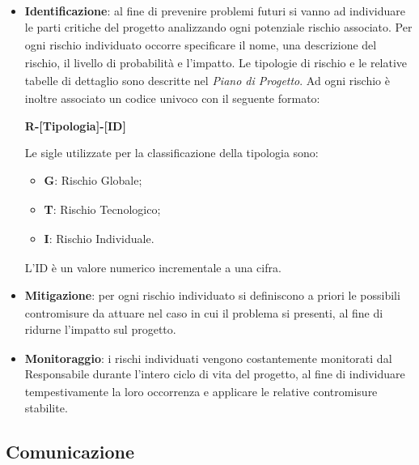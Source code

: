 \documentclass[a4paper,11pt]{article}
\newcommand{\G}{\textsubscript{\scalebox{0.6}{\textbf{G}}}}
\begin{document}
\begin{itemize}
    \item \textbf{Identificazione}: al fine di prevenire problemi futuri si vanno ad individuare le parti critiche del progetto\G{} analizzando ogni potenziale rischio\G{} associato. Per ogni rischio\G{} individuato occorre specificare il nome, una descrizione del rischio\G{}, il livello di probabilità\G{} e l'impatto. Le tipologie di rischio\G{} e le relative tabelle di dettaglio sono descritte nel \textit{Piano di Progetto\G{}}. Ad ogni rischio\G{} è inoltre associato un codice univoco con il seguente formato:
    
    \begin{center}
        \textbf{R-[Tipologia]-[ID]}
    \end{center}
    
    Le sigle utilizzate per la classificazione della tipologia sono:
    \begin{itemize}
        \item \textbf{G}: Rischio\G{} Globale\G{};
        \item \textbf{T}: Rischio\G{} Tecnologico\G{};
        \item \textbf{I}: Rischio\G{} Individuale\G{}.
    \end{itemize}
    L'ID è un valore numerico incrementale a una cifra.
    
    \item \textbf{Mitigazione\G{}}: per ogni rischio\G{} individuato si definiscono a priori le possibili contromisure da attuare nel caso in cui il problema si presenti, al fine di ridurne l'impatto sul progetto\G{}.
    
    \item \textbf{Monitoraggio}: i rischi individuati vengono costantemente monitorati dal Responsabile\G{} durante l'intero ciclo di vita del progetto\G{}, al fine di individuare tempestivamente la loro occorrenza e applicare le relative contromisure stabilite.
\end{itemize}

\subsection{Comunicazione}
\end{document}
